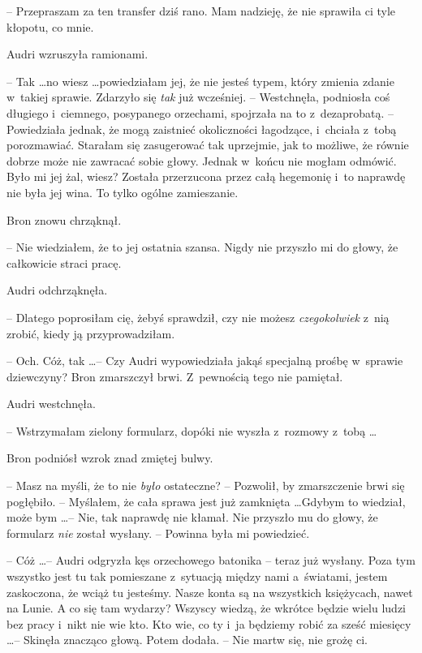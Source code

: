 \documentclass[oneside,polish,11pt,rmheadings]{mwbk}
\begin{document}
-- Przepraszam za ten transfer dziś rano. Mam nadzieję, że nie sprawiła ci tyle kłopotu, co mnie. 

Audri wzruszyła ramionami. 

-- Tak \ldots  no wiesz \ldots  powiedziałam jej, że nie jesteś typem, który zmienia zdanie w~takiej sprawie. Zdarzyło się \textit{tak} już wcześniej. -- Westchnęła, podniosła coś długiego i~ciemnego, posypanego orzechami, spojrzała na to z~dezaprobatą. -- Powiedziała jednak, że mogą zaistnieć okoliczności łagodzące, i~chciała z~tobą porozmawiać. Starałam się zasugerować tak uprzejmie, jak to możliwe, że równie dobrze może nie zawracać sobie głowy. Jednak w~końcu nie mogłam odmówić. Było mi jej żal, wiesz? Została przerzucona przez całą hegemonię i~to naprawdę nie była jej wina. To tylko ogólne zamieszanie. 

Bron znowu chrząknął. 

-- Nie wiedziałem, że to jej ostatnia szansa. Nigdy nie przyszło mi do głowy, że całkowicie straci pracę. 

Audri odchrząknęła. 

-- Dlatego poprosiłam cię, żebyś sprawdził, czy nie możesz \textit{czegokolwiek} z~nią zrobić, kiedy ją przyprowadziłam. 

-- Och. Cóż, tak \ldots  -- Czy Audri wypowiedziała jakąś specjalną prośbę w~sprawie dziewczyny? Bron zmarszczył brwi. Z~pewnością tego nie pamiętał. 

Audri westchnęła. 

-- Wstrzymałam zielony formularz, dopóki nie wyszła z~rozmowy z~tobą  \ldots  

Bron podniósł wzrok znad zmiętej bulwy.  

-- Masz na myśli, że to nie \textit{było  }ostateczne? -- Pozwolił, by zmarszczenie brwi się pogłębiło. -- Myślałem, że cała sprawa jest już zamknięta \ldots   Gdybym to wiedział, może bym \ldots  -- Nie, tak naprawdę nie kłamał. Nie przyszło mu do głowy, że formularz \textit{nie }został wysłany. -- Powinna była mi powiedzieć. 

-- Cóż \ldots  -- Audri odgryzła kęs orzechowego batonika -- teraz już wysłany. Poza tym wszystko jest tu tak pomieszane z~sytuacją między nami a~światami, jestem zaskoczona, że wciąż tu jesteśmy. Nasze konta są na wszystkich księżycach, nawet na Lunie. A co się tam wydarzy? Wszyscy wiedzą, że wkrótce będzie wielu ludzi bez pracy i~nikt nie wie kto. Kto wie, co ty i~ja będziemy robić za sześć miesięcy \ldots  -- Skinęła znacząco głową.  Potem dodała. -- Nie martw się, nie grożę ci. 
\end{document}
